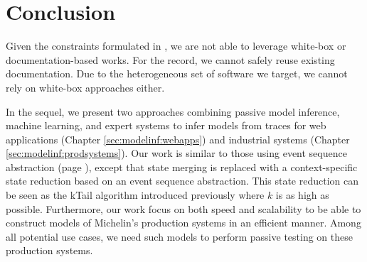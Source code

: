 \section{Conclusion}
\label{sec:related:conclusion}

Given the constraints formulated in
, we are not able to
leverage white-box or documentation-based works. For the record,
we cannot safely reuse existing documentation. Due to the
heterogeneous set of software we target, we cannot rely on
white-box approaches either.

In the sequel, we present two approaches combining passive model
inference, machine learning, and expert systems to infer models
from traces for web applications (Chapter
\ref{sec:modelinf:webapps}) and industrial systems (Chapter
\ref{sec:modelinf:prodsystems}).  Our work is similar to those
using event sequence abstraction (page
\pageref{sec:passive-fsa}), except that state merging is replaced
with a context-specific state reduction based on an event
sequence abstraction. This state reduction can be seen as the
kTail algorithm introduced previously where $k$ is as high as
possible. Furthermore, our work focus on both speed and
scalability to be able to construct models of Michelin's
production systems in an efficient manner. Among all potential
use cases, we need such models to perform passive testing on
these production systems.

